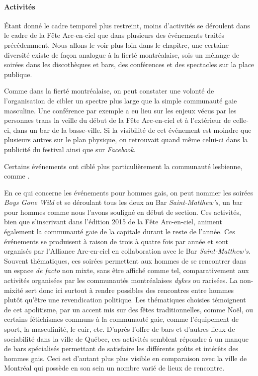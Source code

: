 \paragraph{Activités}
\label{subsec:activitesfetearcenciel}
Étant donné le cadre temporel plus restreint, moins d'activités se déroulent dans le cadre de la Fête Arc-en-ciel que dans plusieurs des événements traités précédemment.
Nous allons le voir plus loin dans le chapitre, une certaine diversité existe de façon analogue à la fierté montréalaise, sois un mélange de soirées dans les discothèques et bars, des conférences et des spectacles sur la place publique.

Comme dans la fierté montréalaise, on peut constater une volonté de l'organisation de cibler un spectre plus large que la simple communauté gaie masculine.
Une conférence par exemple a eu lieu sur les enjeux vécus par les personnes trans la veille du début de la Fête Arc-en-ciel et à l'extérieur de celle-ci, dans un bar de la basse-ville.
Si la visibilité de cet événement est moindre que plusieurs autres sur le plan physique, on retrouvait quand même celui-ci dans la publicité du festival ainsi que sur \emph{Facebook}.

Certains événements ont ciblé plus particulièrement la communauté lesbienne, comme .

En ce qui concerne les événements pour hommes gais, on peut nommer les soirées \emph{Boys Gone Wild} et  se déroulant tous les deux au Bar \emph{Saint-Matthew's}, un bar pour hommes comme nous l'avons souligné en début de section.
Ces activités, bien que s'inscrivant dans l'édition 2015 de la Fête Arc-en-ciel, animent également la communauté gaie de la capitale durant le reste de l'année.
Ces événements se produisent à raison de trois à quatre fois par année et sont organisés par l'Alliance Arc-en-ciel en collaboration avec le Bar \emph{Saint-Matthew's}.
Souvent thématiques, ces soirées permettent aux hommes de se rencontrer dans un espace \emph{de facto} non mixte, sans être affiché comme tel, comparativement aux activités organisées par les communautés montréalaises \emph{dykes} ou racisées.
La non-mixité sert donc ici surtout à rendre possibles des rencontres entre hommes plutôt qu'être une revendication politique.
Les thématiques choisies témoignent de cet apolitisme, par un accent mis sur des fêtes traditionnelles, comme Noël, ou certains fétichismes communs à la communauté gaie, comme l'équipement de sport, la masculinité, le cuir, etc.
D'après l'offre de bars et d'autres lieux de sociabilité dans la ville de Québec, ces activités semblent répondre à un manque de bars spécialisés permettant de satisfaire les différents goûts et intérêts des hommes gais.
Ceci est d'autant plus plus visible en comparaison avec la ville de Montréal qui possède en son sein un nombre varié de lieux de rencontre.

